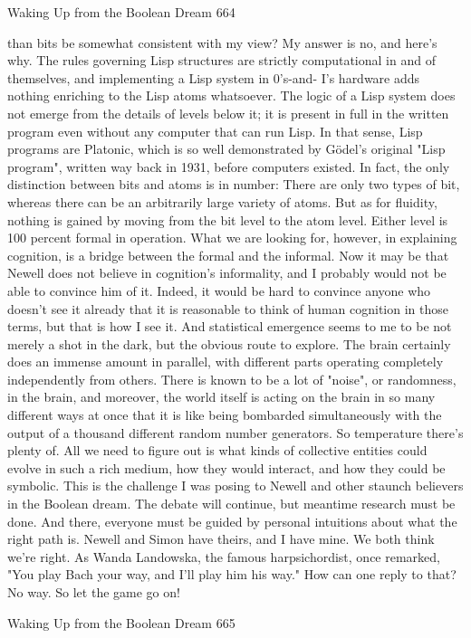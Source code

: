 Waking Up from the Boolean Dream                                                      664

than bits be somewhat consistent with my view? My answer is no, and here's why.
The rules governing Lisp structures are strictly computational in and of themselves,
and implementing a Lisp system in 0's-and- I's hardware adds nothing enriching to the
Lisp atoms whatsoever. The logic of a Lisp system does not emerge from the details
of levels below it; it is present in full in the written program even without any
computer that can run Lisp. In that sense, Lisp programs are Platonic, which is so well
demonstrated by Gödel’s original "Lisp program", written way back in 1931, before
computers existed. In fact, the only distinction between bits and atoms is in number:
There are only two types of bit, whereas there can be an arbitrarily large variety of
atoms. But as for fluidity, nothing is gained by moving from the bit level to the atom
level. Either level is 100 percent formal in operation.
         What we are looking for, however, in explaining cognition, is a bridge
between the formal and the informal. Now it may be that Newell does not believe in
cognition's informality, and I probably would not be able to convince him of it.
Indeed, it would be hard to convince anyone who doesn't see it already that it is
reasonable to think of human cognition in those terms, but that is how I see it. And
statistical emergence seems to me to be not merely a shot in the dark, but the obvious
route to explore. The brain certainly does an immense amount in parallel, with
different parts operating completely independently from others. There is known to be
a lot of "noise", or randomness, in the brain, and moreover, the world itself is acting
on the brain in so many different ways at once that it is like being bombarded
simultaneously with the output of a thousand different random number generators. So
temperature there's plenty of. All we need to figure out is what kinds of collective
entities could evolve in such a rich medium, how they would interact, and how they
could be symbolic.
         This is the challenge I was posing to Newell and other staunch believers in the
Boolean dream. The debate will continue, but meantime research must be done. And
there, everyone must be guided by personal intuitions about what the right path is.
Newell and Simon have theirs, and I have mine. We both think we're right. As Wanda
Landowska, the famous harpsichordist, once remarked, "You play Bach your way,
and I'll play him his way." How can one reply to that? No way. So let the game go on!




Waking Up from the Boolean Dream                                                    665

